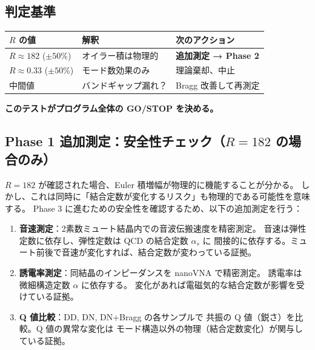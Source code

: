 \documentclass[11pt,a4paper]{article}
\begin{document}
\subsection{判定基準}

\begin{tcolorbox}[colback=red!5,colframe=red!60!black,title=★ THE DECISIVE TEST ★]
\begin{center}
\begin{tabular}{lll}
\toprule
$R$ の値 & 解釈 & 次のアクション \\
\midrule
$R \approx 182$ ($\pm 50\%$) & オイラー積は物理的 & \textbf{追加測定 → Phase 2} \\
$R \approx 0.33$ ($\pm 50\%$) & モード数効果のみ & 理論棄却、中止 \\
中間値 & バンドギャップ漏れ？ & Bragg 改善して再測定 \\
\bottomrule
\end{tabular}
\end{center}
\textbf{このテストがプログラム全体の GO/STOP を決める。}
\end{tcolorbox}

\subsection{Phase 1 追加測定：安全性チェック（$R = 182$ の場合のみ）}

$R = 182$ が確認された場合、Euler 積増幅が物理的に機能することが分かる。
しかし、これは同時に「結合定数が変化するリスク」も物理的である可能性を意味する。
Phase 3 に進むための安全性を確認するため、以下の追加測定を行う：

\begin{enumerate}
\item \textbf{音速測定}：2素数ミュート結晶内での音波伝搬速度を精密測定。
  音速は弾性定数に依存し、弾性定数は QCD の結合定数 $\alpha_s$ に
  間接的に依存する。ミュート前後で音速が変化すれば、結合定数が変わっている証拠。

\item \textbf{誘電率測定}：同結晶のインピーダンスを nanoVNA で精密測定。
  誘電率は微細構造定数 $\alpha$ に依存する。
  変化があれば電磁気的な結合定数が影響を受けている証拠。

\item \textbf{Q 値比較}：DD, DN, DN+Bragg の各サンプルで
  共振の Q 値（鋭さ）を比較。Q 値の異常な変化は
  モード構造以外の物理（結合定数変化）が関与している証拠。
\end{enumerate}
\end{document}
